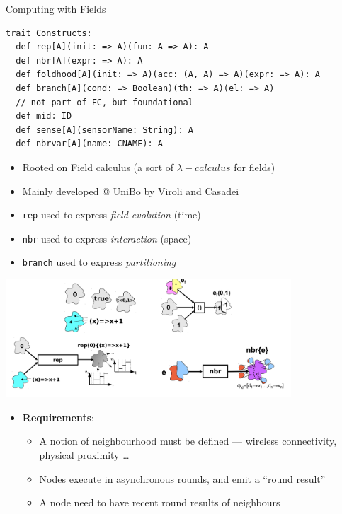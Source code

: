 \documentclass[8pt, aspectratio=169, handout]{beamer}
\begin{document}
\begin{frame}{Computing with Fields}
  \begin{card}
    \begin{verbatim}
trait Constructs:
  def rep[A](init: => A)(fun: A => A): A
  def nbr[A](expr: => A): A
  def foldhood[A](init: => A)(acc: (A, A) => A)(expr: => A): A
  def branch[A](cond: => Boolean)(th: => A)(el: => A)
  // not part of FC, but foundational
  def mid: ID
  def sense[A](sensorName: String): A
  def nbrvar[A](name: CNAME): A
    \end{verbatim}
\begin{itemize}
  \item Rooted on Field calculus (a sort of $\lambda-calculus$ for fields)
  \item Mainly developed @ UniBo by Viroli and Casadei
  \item \texttt{rep} used to express \emph{field evolution} (time)
  \item \texttt{nbr} used to express \emph{interaction} (space)
  \item \texttt{branch} used to express \emph{partitioning}
\end{itemize}
  \end{card}
\framebreak
\begin{card}
  \centering
  \includegraphics[width=0.8\textwidth]{img/high-level-examples.png}
\end{card}
\begin{card}
  \begin{itemize}
    \item \textbf{Requirements}:
    \begin{itemize}
      \item A notion of neighbourhood must be defined — wireless connectivity, physical proximity \dots
      \item Nodes execute in asynchronous rounds, and emit a ``round result''
      \item A node need to have recent round results of neighbours

\end{itemize}
\end{itemize}
\end{card}
\end{frame}
\end{document}
